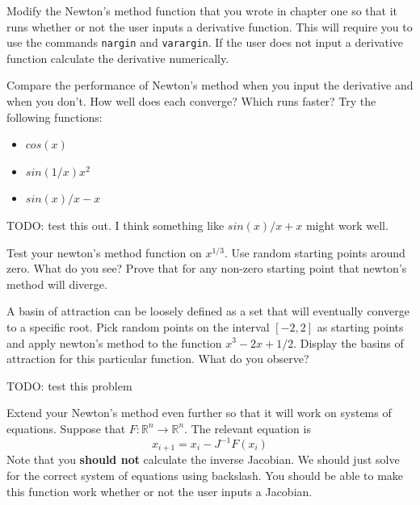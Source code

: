 \begin{problem}
Modify the Newton's method function that you wrote in chapter one so that it runs whether or not the user inputs a derivative function. This will require you to use the commands {\tt nargin} and {\tt varargin}. If the user does not input a derivative function calculate the derivative numerically.

Compare the performance of Newton's method when you input the derivative and when you don't. How well does each converge? Which runs faster? Try the following functions:

\begin{itemize}
\item $cos(x)$
\item $sin(1/x)x^2$
\item $sin(x)/x -x$
\end{itemize}


TODO: test this out. I think something like $sin(x)/x + x$ might work well.

\end{problem}

\begin{problem}
Test your newton's method function on $x^{1/3}$. Use random starting points around zero. What do you see? Prove that for any non-zero starting point that newton's method will diverge.
\end{problem}

\begin{problem}
A basin of attraction can be loosely defined as a set that will eventually converge to a specific root. Pick random points on the interval $[-2,2]$ as starting points and apply newton's method to the function $x^3 -2x + 1/2$. Display the basins of attraction for this particular function. What do you observe?

TODO: test this problem
\end{problem}

\begin{problem}
Extend your Newton's method even further so that it will work on systems of equations. Suppose that $F: \mathbb{R}^n \rightarrow \mathbb{R}^n $. The relevant equation is
\[
x_{i+1} = x_i - J^{-1}F(x_i)
\]
Note that you {\bf should not} calculate the inverse Jacobian. We should just solve for the correct system of equations using backslash. You should be able to make this function work whether or not the user inputs a Jacobian.
\end{problem}
